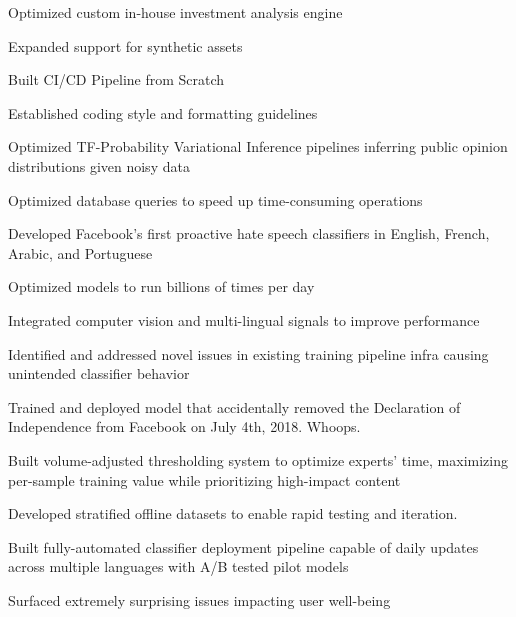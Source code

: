 \documentclass[]{resume}
\begin{document}
\begin{minipage}[t]{1.0\textwidth}
\begin{tightemize}
    \item Optimized custom in-house investment analysis engine
    \item Expanded support for synthetic assets 
    \columnbreak
    \item Built CI/CD Pipeline from Scratch
    \item Established coding style and formatting guidelines
\end{tightemize}


\begin{tightemize}
    \item Optimized TF-Probability Variational Inference pipelines inferring public opinion distributions given noisy data
    
    \columnbreak

    \item Optimized database queries to speed up time-consuming operations
    
\end{tightemize}

\begin{tightemize}
\item Developed Facebook's first proactive hate speech classifiers in English, French, Arabic, and Portuguese
\item Optimized models to run billions of times per day
\item Integrated computer vision and multi-lingual signals to improve performance
\item Identified and addressed novel issues in existing training pipeline infra causing unintended classifier behavior
\item Trained and deployed model that accidentally removed the Declaration of Independence from Facebook on July 4th, 2018. Whoops.

\columnbreak

\item Built volume-adjusted thresholding system to optimize experts' time, maximizing per-sample training value while prioritizing high-impact content
\item Developed stratified offline datasets to enable rapid testing and iteration.
\item Built fully-automated classifier deployment pipeline capable of daily updates 
across multiple languages with A/B tested pilot models
\item Surfaced extremely surprising issues impacting user well-being
\end{tightemize}


\end{minipage}
\end{document}
